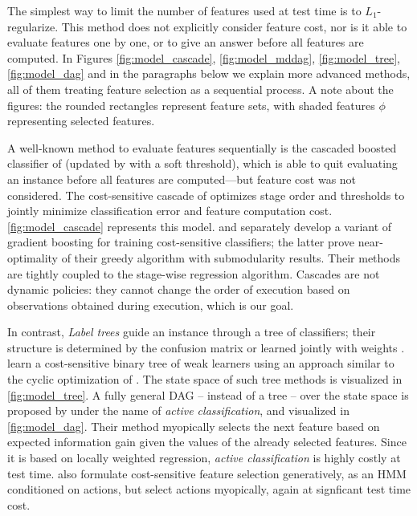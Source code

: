 

The simplest way to limit the number of features used at test time is to $L_1$-regularize.
This method does not explicitly consider feature cost, nor is it able to evaluate features one by one, or to give an answer before all features are computed.
In Figures \ref{fig:model_cascade}, \ref{fig:model_mddag}, \ref{fig:model_tree}, \ref{fig:model_dag} and in the paragraphs below we explain more advanced methods, all of them treating feature selection as a sequential process.
A note about the figures: the rounded rectangles represent feature sets, with shaded features $\phi$ representing selected features.

A well-known method to evaluate features sequentially is the cascaded boosted classifier of \cite{Viola-IJCV-2004} (updated by \cite{Bourdev-CVPR-2005} with a soft threshold), which is able to quit evaluating an instance before all features are computed---but feature cost was not considered.
The cost-sensitive cascade of \cite{Chen-AISTATS-2012} optimizes stage order and thresholds to jointly minimize classification error and feature computation cost.
\autoref{fig:model_cascade} represents this model.
\cite{Xu-ICML-2012} and \cite{Grubb-AISTATS-2012} separately develop a variant of gradient boosting for training cost-sensitive classifiers; the latter prove near-optimality of their greedy algorithm with submodularity results.
Their methods are tightly coupled to the stage-wise regression algorithm.
Cascades are not dynamic policies: they cannot change the order of execution based on observations obtained during execution, which is our goal.

In contrast, \emph{Label trees} guide an instance through a tree of classifiers; their structure is determined by the confusion matrix or learned jointly with weights \parencite{Deng-NIPS-2011}.
\cite{Xu-ICML-2013} learn a cost-sensitive binary tree of weak learners using an approach similar to the cyclic optimization of \parencite{Chen-AISTATS-2012}.
The state space of such tree methods is visualized in \autoref{fig:model_tree}.
A fully general DAG -- instead of a tree  -- over the state space is proposed by \cite{Gao-NIPS-2011} under the name of \emph{active classification}, and visualized in \autoref{fig:model_dag}.
Their method myopically selects the next feature based on expected information gain given the values of the already selected features.
Since it is based on locally weighted regression, \emph{active classification} is highly costly at test time.
\cite{Ji-PR-2007} also formulate cost-sensitive feature selection generatively, as an HMM conditioned on actions, but select actions myopically, again at signficant test time cost.

